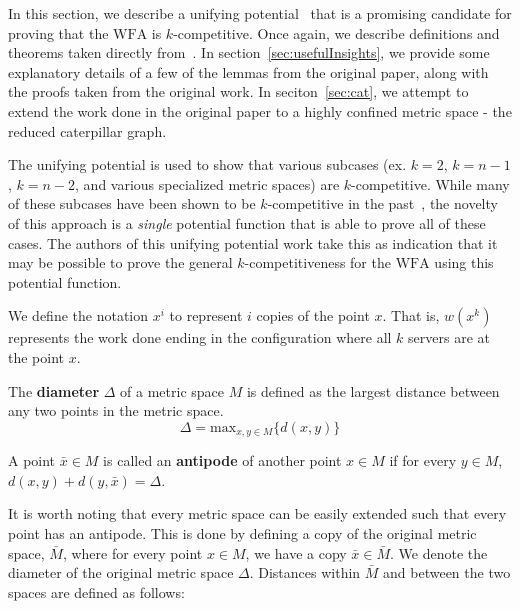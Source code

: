 In this section, we describe a unifying potential~\cite{unifyingPotential2021} that is a promising candidate for proving that the $\mathrm{WFA}$ is $k$-competitive. Once again, we describe definitions and theorems taken directly from~\cite{unifyingPotential2021}. In section~\ref{sec:usefulInsights}, we provide some explanatory details of a few of the lemmas from the original paper, along with the proofs taken from the original work. In seciton~\ref{sec:cat}, we attempt to extend the work done in the original paper to a highly confined metric space - the reduced caterpillar graph.

The unifying potential is used to show that various subcases (ex. $k=2$, $k=n-1$, $k=n-2$, and various specialized metric spaces) are $k$-competitive. While many of these subcases have been shown to be $k$-competitive in the past~\cite{server1991, server2009, server1996, server2004, server2002}, the novelty of this approach is a \textit{single} potential function that is able to prove all of these cases. The authors of this unifying potential work take this as indication that it may be possible to prove the general $k$-competitiveness for the $\mathrm{WFA}$ using this potential function.

\begin{definition}
    We define the notation $x^i$ to represent $i$ copies of the point $x$. That is, $w(x^k)$ represents the work done ending in the configuration where all $k$ servers are at the point $x$.
\end{definition}

\begin{definition}
    The \textbf{diameter} $\Delta$ of a metric space $M$ is defined as the largest distance between any two points in the metric space.
    \begin{equation*}
        \Delta = \mathrm{max}_{x, y \in M} \{ d(x,y)\}
    \end{equation*}
\end{definition}

\begin{definition}
    A point $\bar{x} \in M$ is called an \textbf{antipode} of another point $x \in M$ if for every $y \in M$, $d(x,y) + d(y, \bar{x}) = \Delta$.
\end{definition}

It is worth noting that every metric space can be easily extended such that every point has an antipode. This is done by defining a copy of the original metric space, $\bar{M}$, where for every point $x \in M$, we have a copy $\bar{x} \in \bar{M}$. We denote the diameter of the original metric space $\Delta$. Distances within $\bar{M}$ and between the two spaces are defined as follows:

